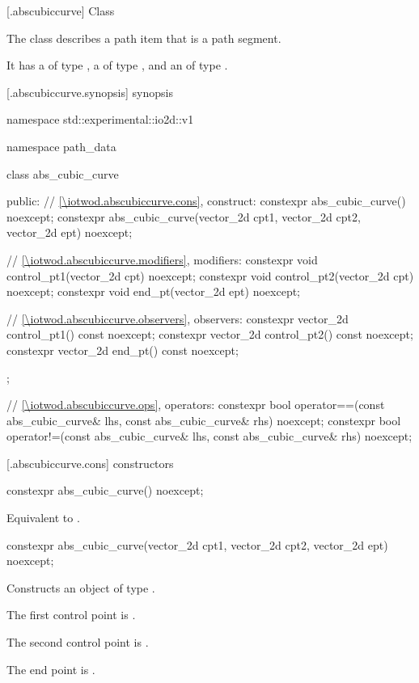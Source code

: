  [\iotwod.abscubiccurve] {Class }

\pnum
{}%
The class  describes a path item that is a path segment.

\pnum
It has a  of type , a  of type , and an  of type .

 [\iotwod.abscubiccurve.synopsis] { synopsis}

\begin{codeblock}
namespace std::experimental::io2d::v1 {
  namespace path_data {
    class abs_cubic_curve {
    public:
      // \ref{\iotwod.abscubiccurve.cons}, construct:
      constexpr abs_cubic_curve() noexcept;
      constexpr abs_cubic_curve(vector_2d cpt1, vector_2d cpt2,
        vector_2d ept) noexcept;

      // \ref{\iotwod.abscubiccurve.modifiers}, modifiers:
      constexpr void control_pt1(vector_2d cpt) noexcept;
      constexpr void control_pt2(vector_2d cpt) noexcept;
      constexpr void end_pt(vector_2d ept) noexcept;

      // \ref{\iotwod.abscubiccurve.observers}, observers:
      constexpr vector_2d control_pt1() const noexcept;
      constexpr vector_2d control_pt2() const noexcept;
      constexpr vector_2d end_pt() const noexcept;
    };
    
    // \ref{\iotwod.abscubiccurve.ops}, operators:
    constexpr bool operator==(const abs_cubic_curve& lhs,
      const abs_cubic_curve& rhs) noexcept;
    constexpr bool operator!=(const abs_cubic_curve& lhs,
      const abs_cubic_curve& rhs) noexcept;
  }
}
\end{codeblock}

 [\iotwod.abscubiccurve.cons] { constructors}

%
\begin{itemdecl}
constexpr abs_cubic_curve() noexcept;
\end{itemdecl}
\begin{itemdescr}
\pnum
\effects
Equivalent to .
\end{itemdescr}

%
\begin{itemdecl}
constexpr abs_cubic_curve(vector_2d cpt1, vector_2d cpt2,
  vector_2d ept) noexcept;
\end{itemdecl}
\begin{itemdescr}
\pnum
\effects
Constructs an object of type .

\pnum
The first control point is .

\pnum
The second control point is .

\pnum
The end point is .
\end{itemdescr}

